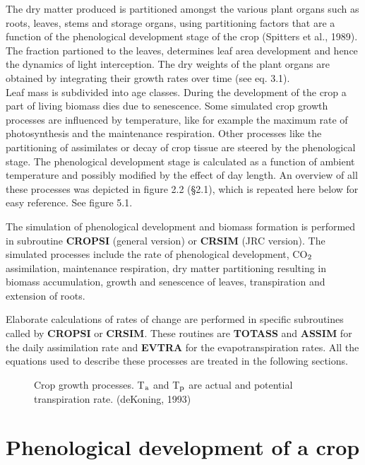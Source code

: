 The dry matter produced is partitioned amongst the various plant organs such as roots,
leaves, stems and storage organs, using partitioning factors that are a function of the
phenological development stage of the crop (Spitters et al., 1989). The fraction partioned
to the leaves, determines leaf area development and hence the dynamics of light intercep\-tion. The dry weights of the plant organs are obtained by integrating their growth rates
over time (see eq. 3.1). \\
Leaf mass is subdivided into age classes. During the development of the crop a part of
living biomass dies due to senescence. Some simulated crop growth processes are
influenced by temperature, like for example the maximum rate of photosyn\-thesis and the
maintenance respiration. Other processes like the partitioning of assimilates or decay of
crop tissue are steered by the pheno\-log\-ical stage. The phenological development stage is
calculated as a function of ambient temperature and possibly modified by the effect of day
length. An overview of all these processes was depicted in figure 2.2 (\S 2.1), which is
repeated here below for easy reference. See figure 5.1.

The simulation of phenological development and biomass formation is performed in
subroutine {\bf CROPSI} (general version) or {\bf CRSIM} (JRC version). The simulated process\-es
include the rate of pheno\-logical develop\-ment, CO$_{{\rm 2}}$ assimilation, mainte\-nance respiration,
dry matter partition\-ing resulting in biomass accumulation, growth and senescence of
leaves, transpiration and extension of roots. 

Elaborate calculations of rates of change are performed in specific subroutines called by
{\bf CROPSI} or {\bf CRSIM}. These routines are {\bf TOTASS} and {\bf ASSIM} for the daily assimilation
rate and {\bf EVTRA} for the evapotranspiration rates. All the equations used to describe these
processes are treated in the following sections.

\begin{figure}[htbp]
\caption{Crop growth pro\-cesses. {\small T$_{{\rm a}}$ and T$_{{\rm p}}$ are actual and potential 
transpiration rate.} (deKoning, 1993)}
 \begin{center} \end{center}
\end{figure}

\section{Phenological development of a crop}

